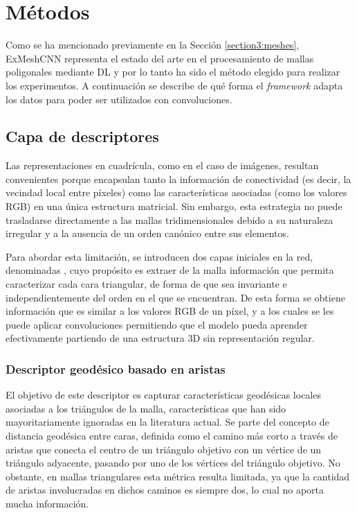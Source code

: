 \section{Métodos}
\label{section4:methods}
Como se ha mencionado previamente en la Sección \ref{section3:meshes}, ExMeshCNN \cite{kim_exmeshcnn_2022} representa el estado del arte en el procesamiento de mallas poligonales mediante DL y por lo tanto ha sido el método elegido para realizar los experimentos. A continuación se describe de qué forma el \textit{framework} adapta los datos para poder ser utilizados con convoluciones.

\subsection{Capa de descriptores}
Las representaciones en cuadrícula, como en el caso de imágenes, resultan convenientes porque encapsulan tanto la información de conectividad (es decir, la vecindad local entre píxeles) como las características asociadas (como los valores RGB) en una única estructura matricial. Sin embargo, esta estrategia no puede trasladarse directamente a las mallas tridimensionales debido a su naturaleza irregular y a la ausencia de un orden canónico entre sus elementos.

Para abordar esta limitación, se introducen dos capas iniciales en la red, denominadas , cuyo propósito es extraer de la malla información que permita caracterizar cada cara triangular, de forma de que sea invariante e independientemente del orden en el que se encuentran. De esta forma se obtiene información que es similar a los valores RGB de un píxel, y a los cuales se les puede aplicar convoluciones permitiendo que el modelo pueda aprender efectivamente partiendo de una estructura 3D sin representación regular. 

\subsubsection{Descriptor geodésico basado en aristas}
El objetivo de este descriptor es capturar características geodésicas locales asociadas a los triángulos de la malla, características que han sido mayoritariamente ignoradas en la literatura actual. Se parte del concepto de distancia geodésica entre caras, definida como el camino más corto a través de aristas que conecta el centro de un triángulo objetivo con un vértice de un triángulo adyacente, pasando por uno de los vértices del triángulo objetivo. No obstante, en mallas triangulares esta métrica resulta limitada, ya que la cantidad de aristas involucradas en dichos caminos es siempre dos, lo cual no aporta mucha información.

